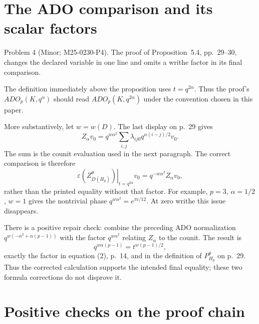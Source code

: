 \documentclass[10pt]{article}
\begin{document}
\section*{The ADO comparison and its scalar factors}
Problem 4 (Minor; M25-0230-P4).  The proof of Proposition 5.4, pp. 29–30, changes the declared variable in one line and omits a writhe factor in its final comparison.\par
The definition immediately above the proposition uses \(t=q^{2\alpha}\). Thus the proof’s \(ADO_p(K,q^\alpha)\) should read \(ADO_p(K,q^{2\alpha})\) under the convention chosen in this paper.\par
More substantively, let \(w=w(D)\). The last display on p. 29 gives \[Z_\alpha v_0
   =q^{w\alpha^2}
        \sum_{i,j}\lambda_{ij0}q^{\alpha(i-j)/2}v_0.\] The sum is the counit evaluation used in the next paragraph. The correct comparison is therefore \[\left.\varepsilon(Z^\theta_{D(H_p)})\right|_{t=q^{2\alpha}}v_0
                  =q^{-w\alpha^2}Z_\alpha v_0,            \tag{8}\] rather than the printed equality without that factor. For example, \(p=3\), \(\alpha=1/2\), \(w=1\) gives the nontrivial phase \(q^{w\alpha^2}=e^{\pi i/12}\). At zero writhe this issue disappears.\par
There is a positive repair check: combine the preceding ADO normalization \(q^{w(-\alpha^2+\alpha(p-1))}\) with the factor \(q^{w\alpha^2}\) relating \(Z_\alpha\) to the counit. The result is \[q^{w\alpha(p-1)}
                    =t^{w(p-1)/2},\] exactly the factor in equation (2), p. 14, and in the definition of \(P_{H_p}^{\theta}\) on p. 29. Thus the corrected calculation supports the intended final equality; these two formula corrections do not disprove it.\par
\section*{Positive checks on the proof chain}
\end{document}
